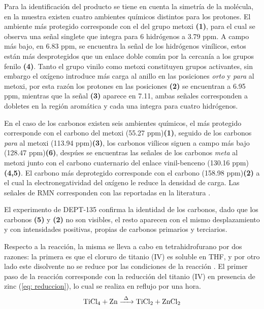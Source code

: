 \documentclass[fleqn,11pt]{SelfArx}
\begin{document}
Para la identificaci\'on del producto se tiene en cuenta la simetr\'ia de la mol\'ecula, en la muestra existen cuatro ambientes químicos distintos para los protones. El ambiente m\'as protegido corresponde con el del grupo metoxi \textbf{(1)}, para el cual se observa una señal singlete que integra para 6 hidr\'ogenos a 3.79 ppm. A campo m\'as bajo, en 6.83 ppm, se encuentra la señal de los hidr\'ogenos vin\'ilicos, estos est\'an m\'as desprotegidos que un enlace doble com\'un por la cercan\'ia a los grupos fenilo \textbf{(4)}. Tanto el grupo vinilo como metoxi constituyen grupos activantes, sin embargo el ox\'igeno introduce m\'as carga al anillo en las posiciones \textit{orto} y \textit{para} al metoxi, por esta raz\'on los protones en las posiciones \textbf{(2)} se encuentran a 6.95 ppm, mientras que la señal \textbf{(3)} aparece en 7.11, ambas señales corresponden a dobletes en la regi\'on arom\'atica y cada una integra para cuatro hidr\'ogenos. 

En el caso de los carbonos existen seis ambientes qu\'imicos, el m\'as protegido corresponde con el carbono del metoxi (55.27 ppm)\textbf{(1)}, seguido de los carbonos \textit{para} al metoxi (113.94 ppm)\textbf{(3)}, los carbonos vi\'ilicos siguen a campo m\'as bajo (128.47 ppm)\textbf{(6)}, desp\'ues se encuentras las señales de los carbonos \textit{meta} al metoxi junto con el carbono cuaternario del enlace vinil-benceno (130.16 ppm)\textbf{(4,5)}. El carbono m\'as deprotegido corresponde con el carbono (158.98 ppm)\textbf{(2)} a el cual la electronegatividad del ox\'igeno le reduce la densidad de carga. Las señales de RMN corresponden con las reportadas en la literatura \cite{Zhong2016}. 

El experimento de DEPT-135 confirma la identidad de los carbonos, dado que los carbonos \textbf{(5)} y \textbf{(2)} no son visibles, el resto aparecen con el mismo desplazamiento y con intensidades positivas, propias de carbonos primarios y terciarios.

Respecto a la reacci\'on, la misma se lleva a cabo en tetrahidrofurano por dos razones: la primera es que el cloruro de titanio (IV) es soluble en THF, y por otro lado este disolvente no se reduce por las condiciones de la reacci\'on \cite{richards2001}. El primer paso de la reacci\'on corresponde con la reducci\'on del titanio (IV) en presencia de zinc (\autoref{eq: reduccion}), lo cual se realiza en reflujo por una hora.
\begin{equation}\label{eq: reduccion}
	\ce{TiCl4 + Zn ->[\Delta] TiCl2 + ZnCl2}
\end{equation}
\end{document}
